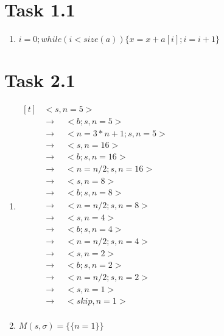 \documentclass{article}
\author{\hmwkAuthorName}
\date{}
\newcommand{\answer}{\item[]} %
\begin{document}
	
	
	\section{Task 1.1}
	
		\begin{enumerate}[label={(\alph*)}]
			
			\answer $i = 0; while(i < size(a))\{x = x + a[i]; i = i + 1 \}$
			
		\end{enumerate}
	
	\section{Task 2.1}
		\begin{enumerate}[label = {(\alph*)}]
			
			\item 
			$\begin{aligned}[t]
				& <s, {n = 5}> \\
				&\rightarrow \quad <b; s, {n = 5}> \\
				&\rightarrow \quad <n = 3 * n + 1; s, {n = 5}> \\
				&\rightarrow \quad <s, {n = 16}> \\
				&\rightarrow \quad <b; s, {n = 16}> \\
				&\rightarrow \quad <n = n / 2; s, {n = 16}> \\
				&\rightarrow \quad <s, {n = 8}> \\
				&\rightarrow \quad <b; s, {n = 8}> \\
				&\rightarrow \quad <n = n / 2; s, {n = 8}> \\
				&\rightarrow \quad <s, {n = 4}> \\
				&\rightarrow \quad <b; s, {n = 4}> \\
				&\rightarrow \quad <n = n / 2; s, {n = 4}> \\
				&\rightarrow \quad <s, {n = 2}> \\
				&\rightarrow \quad <b; s, {n = 2}> \\
				&\rightarrow \quad <n = n / 2;s, {n = 2}> \\
				&\rightarrow \quad <s, {n = 1}> \\
				&\rightarrow \quad <skip, {n = 1}> \\
			\end{aligned}$
			
			\item $M(s, \sigma) = \{\{n = 1\}\}$
			
		\end{enumerate}
	
\end{document}
